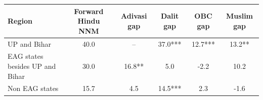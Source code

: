 \begin{tabular}{lccccc}
\hline
Region & Forward Hindu NNM & Adivasi gap & Dalit gap & OBC gap & Muslim gap \\
\hline
UP and Bihar&40.0&--&37.0***&12.7***&13.2**\\
EAG states besides UP and Bihar&30.0&16.8**&5.0&-2.2&10.2\\
Non EAG states&15.7&4.5&14.5***&2.3&-1.6\\
\hline
\end{tabular}
